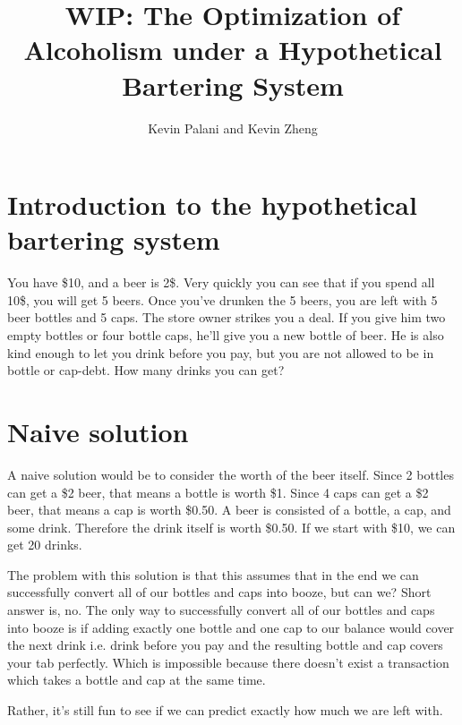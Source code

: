\documentclass[letterpaper, 12pt]{article}
\title{WIP: The Optimization of Alcoholism under a Hypothetical Bartering System}
\author{Kevin Palani and Kevin Zheng}
\begin{document}
\maketitle
\tableofcontents
\lstset{
    breaklines=true
}
\section{Introduction to the hypothetical bartering system}
\par You have \$10, and a beer is 2\$.
Very quickly you can see that if you spend all 10\$, you will get 5 beers.
Once you've drunken the 5 beers, you are left with 5 beer bottles and 5 caps.
The store owner strikes you a deal.
If you give him two empty bottles or four bottle caps, he'll give you a new bottle of beer.
He is also kind enough to let you drink before you pay, but you are not allowed to be in bottle or cap-debt.
How many drinks you can get?
\section{Naive solution}
A naive solution would be to consider the worth of the beer itself.
Since 2 bottles can get a \$2 beer, that means a bottle is worth \$1.
Since 4 caps can get a \$2 beer, that means a cap is worth \$0.50.
A beer is consisted of a bottle, a cap, and some drink.
Therefore the drink itself is worth \$0.50.
If we start with \$10, we can get 20 drinks.

The problem with this solution is that this assumes that in the end we can successfully convert all of our bottles and caps into booze, but can we?
Short answer is, no.
The only way to successfully convert all of our bottles and caps into booze is if adding exactly one bottle and one cap to our balance would cover the next drink i.e. drink before you pay and the resulting bottle and cap covers your tab perfectly.
Which is impossible because there doesn't exist a transaction which takes a bottle and cap at the same time.

Rather, it's still fun to see if we can predict exactly how much we are left with.
\end{document}
